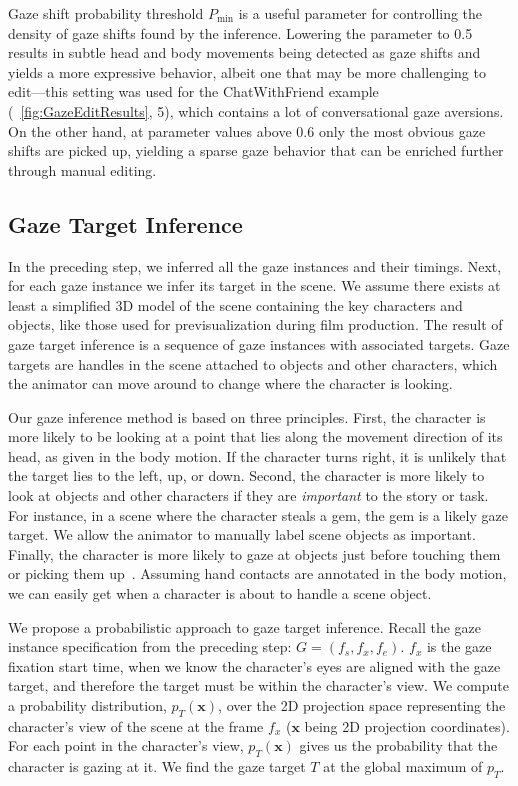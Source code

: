Gaze shift probability threshold $P_\mathrm{min}$ is a useful parameter for controlling the density of gaze shifts found by the inference. Lowering the parameter to 0.5 results in subtle head and body movements being detected as gaze shifts and yields a more expressive behavior, albeit one that may be more challenging to edit---this setting was used for the ChatWithFriend example (~\ref{fig:GazeEditResults}, 5), which contains a lot of conversational gaze aversions. On the other hand, at parameter values above 0.6 only the most obvious gaze shifts are picked up, yielding a sparse gaze behavior that can be enriched further through manual editing.

\subsection{Gaze Target Inference}
\label{sec:GazeTargetInference}

In the preceding step, we inferred all the gaze instances and their timings. Next, for each gaze instance we infer its target in the scene. We assume there exists at least a simplified 3D model of the scene containing the key characters and objects, like those used for previsualization during film production. The result of gaze target inference is a sequence of gaze instances with associated targets. Gaze targets are handles in the scene attached to objects and other characters, which the animator can move around to change where the character is looking.

Our gaze inference method is based on three principles. First, the character is more likely to be looking at a point that lies along the movement direction of its head, as given in the body motion. If the character turns right, it is unlikely that the target lies to the left, up, or down. Second, the character is more likely to look at objects and other characters if they are \emph{important} to the story or task. For instance, in a scene where the character steals a gem, the gem is a likely gaze target. We allow the animator to manually label scene objects as important. Finally, the character is more likely to gaze at objects just before touching them or picking them up~\citep{johansson2001eyehead}. Assuming hand contacts are annotated in the body motion, we can easily get when a character is about to handle a scene object.

We propose a probabilistic approach to gaze target inference. Recall the gaze instance specification from the preceding step: $G = (f_s, f_x, f_e)$. $f_x$ is the gaze fixation start time, when we know the character's eyes are aligned with the gaze target, and therefore the target must be within the character's view. We compute a probability distribution, $p_T(\mathbf{x})$, over the 2D projection space representing the character's view of the scene at the frame $f_x$ ($\mathbf{x}$ being 2D projection coordinates). For each point in the character's view, $p_T(\mathbf{x})$ gives us the probability that the character is gazing at it. We find the gaze target $T$ at the global maximum of $p_T$.

